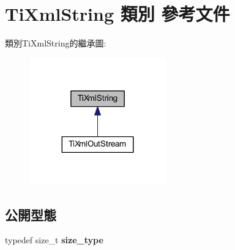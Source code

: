 \hypertarget{class_ti_xml_string}{}\section{Ti\+Xml\+String 類別 參考文件}
\label{class_ti_xml_string}


類別\+Ti\+Xml\+String的繼承圖\+:\nopagebreak
\begin{figure}[H]
\begin{center}
\leavevmode
\includegraphics[width=167pt]{class_ti_xml_string__inherit__graph}
\end{center}
\end{figure}
\subsection*{公開型態}
\begin{DoxyCompactItemize}
\item 
typedef size\+\_\+t {\bfseries size\+\_\+type}\hypertarget{class_ti_xml_string_abeb2c1893a04c17904f7c06546d0b971}{}\label{class_ti_xml_string_abeb2c1893a04c17904f7c06546d0b971}

\end{DoxyCompactItemize}
